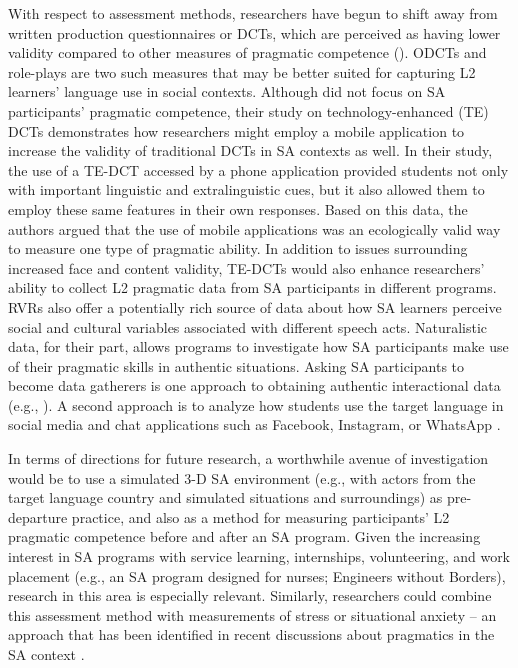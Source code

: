 \documentclass[output=paper]{langscibook}
\begin{document}
With respect to assessment methods, researchers have begun to shift away from written production questionnaires or DCTs, which are perceived as having lower validity compared to other measures of pragmatic competence (\citealt{Félix-Brasdefer2010,PérezVidalShively2019}). ODCTs and role-plays are two such measures that may be better suited for capturing L2 learners’ language use in social contexts. Although \citet{RockeyEtAl2020} did not focus on SA participants’ pragmatic competence, their study on technology-enhanced (TE) DCTs demonstrates how researchers might employ a mobile application to increase the validity of traditional DCTs in SA contexts as well. In their study, the use of a TE-DCT accessed by a phone application provided students not only with important linguistic and extralinguistic cues, but it also allowed them to employ these same features in their own responses. Based on this data, the authors argued that the use of mobile applications was an ecologically valid way to measure one type of pragmatic ability. In addition to issues surrounding increased face and content validity, TE-DCTs would also enhance researchers’ ability to collect L2 pragmatic data from SA participants in different programs. RVRs also offer a potentially rich source of data about how SA learners perceive social and cultural variables associated with different speech acts. Naturalistic data, for their part, allows programs to investigate how SA participants make use of their pragmatic skills in authentic situations. Asking SA participants to become data gatherers is one approach to obtaining authentic interactional data (e.g., \citealt{Shively2011}). A second approach is to analyze how students use the target language in social media and chat applications such as Facebook, Instagram, or WhatsApp \citep{PérezVidalShively2019}.

In terms of directions for future research, a worthwhile avenue of investigation would be to use a simulated 3-D SA environment (e.g., with actors from the target language country and simulated situations and surroundings) as pre-departure practice, and also as a method for measuring participants’ L2 pragmatic competence before and after an SA program. Given the increasing interest in SA programs with service learning, internships, volunteering, and work placement (e.g., an SA program designed for nurses; Engineers without Borders), research in this area is especially relevant. Similarly, researchers could combine this assessment method with measurements of stress or situational anxiety -- an approach that has been identified in recent discussions about pragmatics in the SA context \citep{PérezVidalShively2019}.
\end{document}
